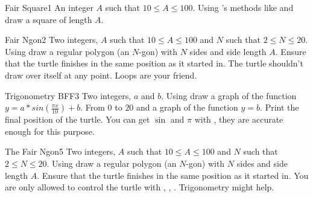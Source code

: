 
\begin{task}{Fair Square}{1}
\In
An integer $A$ such that $10 \leq A \leq 100$.
\Out
Using 's methods like 
 and  draw a square of length $A$.
\end{task}

\begin{task}{Fair Ngon}{2}
\In
Two integers, $A$ such that $10 \leq A \leq 100$ and $N$
such that $2 \leq N \leq 20$.
\Out
Using  draw a regular polygon (an $N$-gon) with $N$ sides and side
length $A$. Ensure that the turtle finishes in the same position as it started
in. The turtle shouldn't draw over itself at any point.
\Hint
Loops are your friend.
\end{task}

\begin{task}{Trigonometry BFF}{3}
\In
Two integers, $a$ and $b$.
\Out
Using  draw a graph of the function $y = a * sin(\frac{\pi x}{10}) + b$.
From $0$ to $20$ and a graph of the function $y = b$. Print the final position
of the turtle.
\Hint
You can get $\sin$ and $\pi$ with , they are accurate
enough for this purpose.
\end{task}

\begin{task}{The Fair Ngon}{5}
\In
Two integers, $A$ such that $10 \leq A \leq 100$ and $N$
such that $2 \leq N \leq 20$.
\Out
Using  draw a regular polygon (an $N$-gon) with $N$ sides and side
length $A$. Ensure that the turtle finishes in the same position as it started
in. You are only allowed to control the turtle with , ,
.
\Hint
Trigonometry might help.
\end{task}
